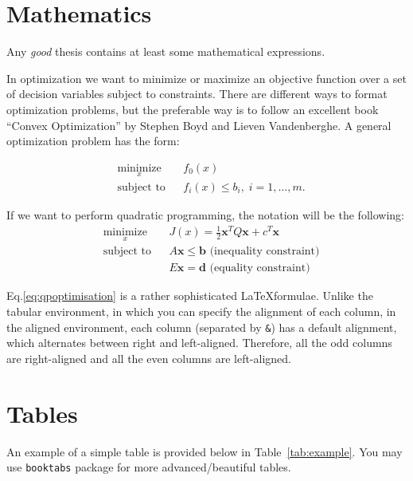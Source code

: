 \documentclass[a4paper,11pt,phdthesis,twoside,oneandhalfspace,pdflatex]{cssethesis} %
\begin{document}
\section{Mathematics}
Any \textit{good} thesis contains at least some mathematical expressions. 

In optimization we want to minimize or maximize an objective function over a set of decision variables subject to constraints. There are different ways to format optimization problems, but the preferable way is to follow an excellent book ``Convex Optimization'' by Stephen Boyd and Lieven Vandenberghe. A general optimization problem has the form:

\begin{equation*}
 \begin{aligned}
 & \underset{x}{\text{minimize}}
 & & f_0(x) \\
 & \text{subject to}
 & & f_i(x) \leq b_i, \; i = 1, \ldots, m.
 \end{aligned}
\end{equation*}

If we want to perform quadratic programming, the notation will be the following:
\begin{equation}\label{eq:qpoptimisation}
 \begin{aligned}
 & \underset{x}{\text{minimize}}
 & & J(x) = \frac{1}{2} \mathbf{x}^T Q \mathbf{x} + c^T \mathbf{x} \\
 & \text{subject to} 
 & & A\mathbf{x} \leq \mathbf b \mbox{  (inequality constraint)} \\
 & 
 & &     E\mathbf{x} = \mathbf d  \mbox{  (equality constraint)}
 \end{aligned}
\end{equation}

Eq.\ref{eq:qpoptimisation} is a rather sophisticated \LaTeX formulae. Unlike the tabular environment, in which you can specify the alignment of each column, in the aligned environment, each column (separated by \verb|&|) has a default alignment, which alternates between right and left-aligned. Therefore, all the odd columns are right-aligned and all the even columns are left-aligned.




\section{Tables}
An example of a simple table is provided below in Table~\ref{tab:example}. You may use \verb+booktabs+ package for more advanced/beautiful tables.
\end{document}
